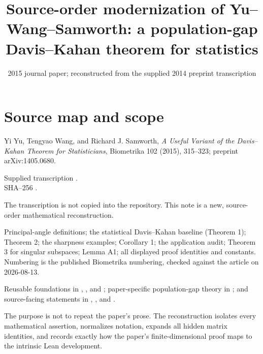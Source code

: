 
\title{Source-order modernization of Yu--Wang--Samworth: a population-gap Davis--Kahan theorem for statistics}
\author{}
\date{2015 journal paper; reconstructed from the supplied 2014 preprint transcription}

\maketitle

\section*{Source map and scope}
\begin{sourceguide}
\item[Primary source] Yi Yu, Tengyao Wang, and Richard J. Samworth, \emph{A Useful Variant of the Davis--Kahan Theorem for Statisticians}, Biometrika 102 (2015), 315--323; preprint arXiv:1405.0680.
\item[Local evidence] Supplied transcription {\small{}}.\\ SHA--256 \texttt{}.
\item[Redistribution] The transcription is not copied into the repository. This note is a new, source-order mathematical reconstruction.
\item[Coverage] Principal-angle definitions; the statistical Davis--Kahan baseline (Theorem 1); Theorem 2; the sharpness examples; Corollary 1; the application audit; Theorem 3 for singular subspaces; Lemma A1; all displayed proof identities and constants. Numbering is the published Biometrika numbering, checked against the article on 2026-08-13.
\item[Formalization target] Reusable foundations in , , and ; paper-specific population-gap theory in ; and source-facing statements in , , and .
\end{sourceguide}

The purpose is not to repeat the paper's prose. The reconstruction isolates every mathematical assertion, normalizes notation, expands all hidden matrix identities, and records exactly how the paper's finite-dimensional proof maps to the intrinsic Lean development.

